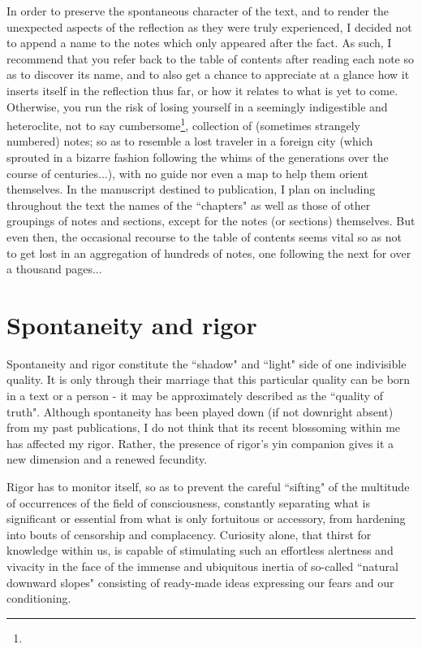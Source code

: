 In order to preserve the spontaneous character of the text, and to render the unexpected aspects of the reflection as they were truly experienced, I decided not to append a name to the notes which only appeared after the fact. As such, I recommend that you refer back to the table of contents after reading each note so as to discover its name, and to also get a chance to appreciate at a glance how it inserts itself in the reflection thus far, or how it relates to what is yet to come. Otherwise, you run the risk of losing yourself in a seemingly indigestible and heteroclite, not to say cumbersome\footnote{}, collection of (sometimes strangely numbered) notes; so as to resemble a lost traveler in a foreign city (which sprouted in a bizarre fashion following the whims of the generations over the course of centuries...), with no guide nor even a map to help them orient themselves. In the manuscript destined to publication, I plan on including throughout the text the names of the ``chapters" as well as those of other groupings of notes and sections, except for the notes (or sections) themselves. But even then, the occasional recourse to the table of contents seems vital so as not to get lost in an aggregation of hundreds of notes, one following the next for over a thousand pages...

\section{Spontaneity and rigor}

Spontaneity and rigor constitute the ``shadow" and ``light" side of one indivisible quality. It is only through their marriage that this particular quality can be born in a text or a person - it may be approximately described as the ``quality of truth". Although spontaneity has been played down (if not downright absent) from my past publications, I do not think that its recent blossoming within me has affected my rigor. Rather, the presence of rigor's yin companion gives it a new dimension and a renewed fecundity.

Rigor has to monitor itself, so as to prevent the careful ``sifting" of the multitude of occurrences of the field of consciousness, constantly separating what is significant or essential from what is only fortuitous or accessory, from hardening into bouts of censorship and complacency. Curiosity alone, that thirst for knowledge within us, is capable of stimulating such an effortless alertness and vivacity in the face of the immense and ubiquitous inertia of so-called ``natural downward slopes" consisting of ready-made ideas expressing our fears and our conditioning. 

